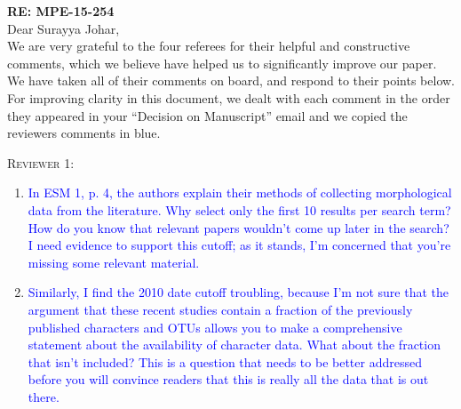 \documentclass[12pt,letterpaper]{article}
\renewcommand{\section}[1]{%
\bigskip
\begin{center}
\begin{Large}
\normalfont\scshape #1
\medskip
\end{Large}
\end{center}}
\begin{document}
\textbf{RE: MPE-15-254}\\
\bigskip
Dear Surayya Johar,\\
\bigskip
We are very grateful to the four referees for their helpful and constructive comments, which we believe have helped us to significantly improve our paper. We have taken all of their comments on board, and respond to their points below. For improving clarity in this document, we dealt with each comment in the order they appeared in your ``Decision on Manuscript'' email and we copied the reviewers comments in blue.


\section{Reviewer 1:}
\begin{enumerate}
\item{\textcolor{blue}{In ESM 1, p. 4, the authors explain their methods of collecting morphological data from the literature. Why select only the first 10 results per search term? How do you know that relevant papers wouldn’t come up later in the search? I need evidence to support this cutoff; as it stands, I’m concerned that you’re missing some relevant material.}}

\item{\textcolor{blue}{Similarly, I find the 2010 date cutoff troubling, because I’m not sure that the argument that these recent studies contain a fraction of the previously published characters and OTUs allows you to make a comprehensive statement about the availability of character data. What about the fraction that isn’t included? This is a question that needs to be better addressed before you will convince readers that this is really all the data that is out there.}}
\end{enumerate}
\end{document}

